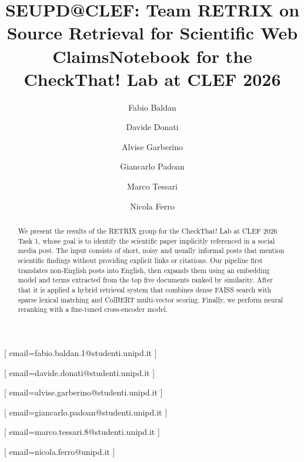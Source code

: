 \documentclass{ceurart}
\begin{document}


  \title{SEUPD@CLEF: Team RETRIX on Source Retrieval for Scientific Web Claims}
  \title[mode=sub]{Notebook for the CheckThat! Lab at CLEF 2026}

  \author[1]{Fabio Baldan}[%
    email=fabio.baldan.1@studenti.unipd.it
  ]
  \cormark[1]

  \author[1]{Davide Donati}[%
    email=davide.donati@studenti.unipd.it
  ]

  \author[1]{Alvise Garberino}[%
    email=alvise.garberino@studenti.unipd.it
  ]

  \author[1]{Giancarlo Padoan}[%
    email=giancarlo.padoan@studenti.unipd.it
  ]

  \author[1]{Marco Tessari}[%
    email=marco.tessari.8@studenti.unipd.it
  ]

  \author[1]{Nicola Ferro}[%
    email=nicola.ferro@unipd.it
  ]

\address[1]{University of Padua, Italy}


  \begin{abstract}
    We present the results of the RETRIX group for the CheckThat! Lab at CLEF 2026 Task 1, whose goal is to identify the scientific paper implicitly referenced in a social media post. The input consists of short, noisy and usually informal posts that mention scientific findings without providing explicit links or citations. Our pipeline first translates non-English posts into English, then expands them using an embedding model and terms extracted from the top five documents ranked by similarity. After that it is applied a hybrid retrieval system that combines dense FAISS search with sparse lexical matching and ColBERT multi-vector scoring. Finally, we perform neural reranking with a fine-tuned cross-encoder model.
  \end{abstract}
\end{document}
